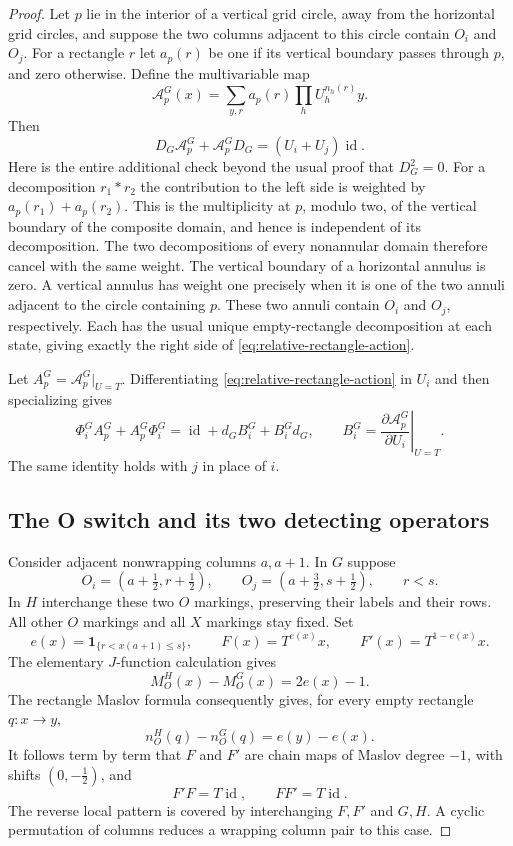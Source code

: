 \documentclass[11pt,a4paper]{article}
\theoremstyle{remark}
\begin{document}
\begin{proof}
Let $p$ lie in the interior of a vertical grid circle, away from the
horizontal grid circles, and suppose the two columns adjacent to this
circle contain $O_i$ and $O_j$.  For a rectangle $r$ let $a_p(r)$ be one
if its vertical boundary passes through $p$, and zero otherwise.  Define
the multivariable map
\[
 \mathcal A_p^G(x)=\sum_{y,r} a_p(r)
                      \prod_hU_h^{n_h(r)}y.
\]
Then
\begin{equation}\label{eq:relative-rectangle-action}
 D_G\mathcal A_p^G+\mathcal A_p^GD_G=(U_i+U_j)\operatorname{id}.
\end{equation}
Here is the entire additional check beyond the usual proof that $D_G^2=0$.
For a decomposition $r_1*r_2$ the contribution to the left side is weighted
by $a_p(r_1)+a_p(r_2)$.  This is the multiplicity at $p$, modulo two, of
the vertical boundary of the composite domain, and hence is independent
of its decomposition.  The two decompositions of every nonannular domain
therefore cancel with the same weight.  The vertical boundary of a
horizontal annulus is zero.  A vertical annulus has weight one precisely
when it is one of the two annuli adjacent to the circle containing $p$.
These two annuli contain $O_i$ and $O_j$, respectively.  Each has the usual
unique empty-rectangle decomposition at each state, giving exactly the
right side of \eqref{eq:relative-rectangle-action}.

Let $A_p^G=\mathcal A_p^G|_{U=T}$.  Differentiating
\eqref{eq:relative-rectangle-action} in $U_i$ and then specializing gives
\begin{equation}\label{eq:clifford-relation}
 \Phi_i^GA_p^G+A_p^G\Phi_i^G
 =\operatorname{id}+d_GB_i^G+B_i^Gd_G,
 \qquad
 B_i^G=\left.\frac{\partial\mathcal A_p^G}{\partial U_i}\right|_{U=T}.
\end{equation}
The same identity holds with $j$ in place of $i$.

\subsection{The O switch and its two detecting operators}

Consider adjacent nonwrapping columns $a,a+1$.  In $G$ suppose
\[
 O_i=(a+\tfrac12,r+\tfrac12),\qquad
 O_j=(a+\tfrac32,s+\tfrac12),\qquad r<s.
\]
In $H$ interchange these two $O$ markings, preserving their labels and
their rows.  All other $O$ markings and all $X$ markings stay fixed.
Set
\[
 e(x)=\mathbf1_{\{r<x(a+1)\le s\}},\qquad
 F(x)=T^{e(x)}x,\qquad F'(x)=T^{1-e(x)}x.
\]
The elementary $J$-function calculation gives
\[
 M_O^H(x)-M_O^G(x)=2e(x)-1.
\]
The rectangle Maslov formula consequently gives, for every empty rectangle
$q:x\longrightarrow y$,
\begin{equation}\label{eq:O-exponent-change}
 n_O^H(q)-n_O^G(q)=e(y)-e(x).
\end{equation}
It follows term by term that $F$ and $F'$ are chain maps of Maslov degree
$-1$, with shifts $(0,-\tfrac12)$, and
\[
 F'F=T\operatorname{id},\qquad FF'=T\operatorname{id}.
\]
The reverse local pattern is covered by interchanging $F,F'$ and $G,H$.
A cyclic permutation of columns reduces a wrapping column pair to this
case.


\end{proof}
\end{document}
